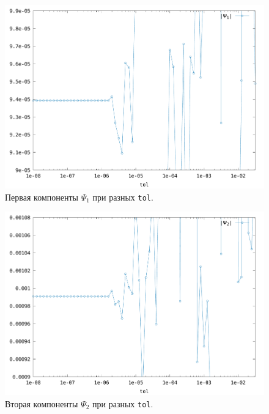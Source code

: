 \documentclass[12pt]{article}
\begin{document}
\begin{figure}[H]
  \hspace{0.5cm}
  \includegraphics[scale=0.5]{psi1_tol_sn}
  \caption{\label{fig:3}Первая компоненты \(\Psi_{1}\) при разных \texttt{tol}.}
\end{figure}

\begin{figure}[H]
  \hspace{0.5cm}
  \includegraphics[scale=0.5]{psi2_tol_sn}
  \caption{\label{fig:4}Вторая компоненты \(\Psi_{2}\) при разных \texttt{tol}.}
\end{figure}
\end{document}
